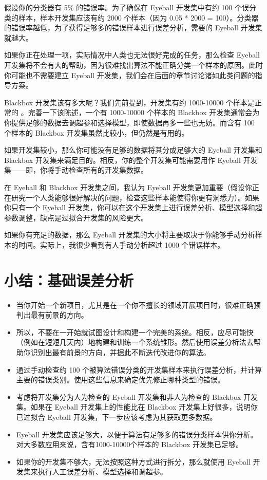 假设你的分类器有 5\% 的错误率。为了确保在 Eyeball 开发集中有约 100
个误分类的样本，样本开发集应该有约 2000 个样本（因为 0.05 * 2000 =
100）。分类器的错误率越低，为了获得足够多的错误样本进行误差分析，需要的
Eyeball 开发集就越大。

如果你正在处理一项，实际情况中人类也无法很好完成的任务，那么检查 Eyeball
开发集将不会有大的帮助，因为很难找出算法不能正确分类一个样本的原因。此时你可能也不需要建立
Eyeball 开发集，我们会在后面的章节讨论诸如此类问题的指导方案。

Blackbox 开发集该有多大呢？我们先前提到，开发集有约 1000-10000
个样本是正常的 。完善一下该陈述，一个有 1000-10000 个样本的 Blackbox
开发集通常会为你提供足够的数据去调超参和选择模型，即使数据再多一些也无妨。而含有
100 个样本的 Blackbox 开发集虽然比较小，但仍然是有用的。

如果开发集较小，那么你可能没有足够的数据将其分成足够大的 Eyeball
开发集和 Blackbox 开发集来满足目的。相反，你的整个开发集可能需要用作
Eyeball 开发集------即，你将手动检查所有的开发集数据。

在 Eyeball 和 Blackbox 开发集之间，我认为 Eyeball
开发集更加重要（假设你正在研究一个人类能够很好解决的问题，检查这些样本能使得你更有洞悉力）。如果你只有一个
Eyeball
开发集，你可以在这个开发集上进行误差分析、模型选择和超参数调整，缺点是过拟合开发集的风险更大。

如果你有充足的数据，那么 Eyeball
开发集的大小将主要取决于你能够手动分析样本的时间。实际上，我很少看到有人手动分析超过
1000 个错误样本。

\hypertarget{ux5c0fux7ed3ux57faux7840ux8befux5deeux5206ux6790}{%
\chapter{小结：基础误差分析}\label{ux5c0fux7ed3ux57faux7840ux8befux5deeux5206ux6790}}

\begin{itemize}
\tightlist
\item
  当你开始一个新项目，尤其是在一个你不擅长的领域开展项目时，很难正确预判出最有前景的方向。
\item
  所以，不要在一开始就试图设计和构建一个完美的系统。相反，应尽可能快（例如在短短几天内）地构建和训练一个系统雏形。然后使用误差分析法去帮助你识别出最有前景的方向，并据此不断迭代改进你的算法。
\item
  通过手动检查约 100
  个被算法错误分类的开发集样本来执行误差分析，并计算主要的错误类别。使用这些信息来确定优先修正哪种类型的错误。
\item
  考虑将开发集分为人为检查的 Eyeball 开发集和非人为检查的 Blackbox
  开发集。如果在 Eyeball 开发集上的性能比在 Blackbox
  开发集上好很多，说明你已过拟合 Eyeball
  开发集，下一步应该考虑为其获取更多数据。
\item
  Eyeball
  开发集应该足够大，以便于算法有足够多的错误分类样本供你分析。对大多数应用来说，含有1000-10000个样本的
  Blackbox 开发集已足够。
\item
  如果你的开发集不够大，无法按照这种方式进行拆分，那么就使用 Eyeball
  开发集来执行人工误差分析、模型选择和调超参。
\end{itemize}

